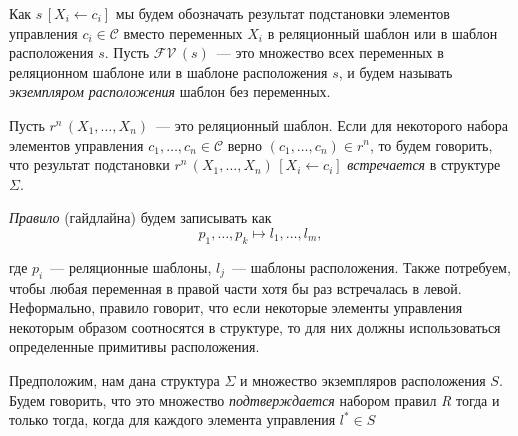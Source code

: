 Как $s\,[X_i\gets c_i]$ мы будем обозначать результат подстановки элементов управления
$c_i\in\mathcal{C}$
вместо переменных $X_i$ в реляционный шаблон или в шаблон расположения  $s$. Пусть $\mathcal{FV}\,(s)$~--- это множество всех переменных в реляционном шаблоне или в шаблоне расположения $s$, и будем называть \emph{экземпляром расположения} шаблон без переменных.



Пусть $r^n\,(X_1,\dots,X_n)$~--- это реляционный шаблон. Если для некоторого набора элементов управления $c_1,\dots,c_n\in\mathcal{C}$ верно %
$(c_1,\dots,c_n)\in r^n$, то будем говорить, что результат подстановки $r^n\,(X_1,\dots,X_n)\,[X_i\gets c_i]$
%
\emph{встречается} в структуре $\Sigma$. %


\emph{Правило} (гайдлайна) будем записывать как
\[
p_1,\dots,p_k\mapsto l_1,\dots,l_m,
\]


\noindent  где $p_i$~--- реляционные шаблоны, $l_j$~--- шаблоны расположения.
Также потребуем, чтобы любая переменная в правой части хотя бы раз встречалась в левой. Неформально, правило говорит, что если некоторые элементы управления некоторым образом соотносятся в структуре, то  для них должны использоваться определенные примитивы расположения.


Предположим, нам дана структура $\Sigma$ и множество экземпляров расположения $S$.
Будем говорить, что это множество \emph{подтверждается} набором правил
  \emph{R} тогда и только тогда, когда для каждого элемента управления $l^*\in S$


